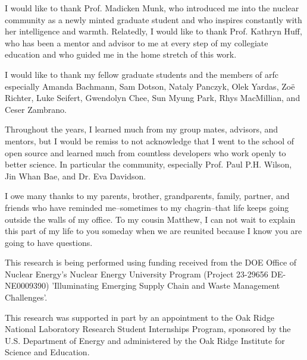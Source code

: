 I would like to thank Prof. Madicken Munk, who introduced me into
the nuclear community as a newly minted graduate student and who inspires
constantly with her intelligence and warmth. Relatedly, I would like to thank
Prof. Kathryn Huff, who has been a mentor and advisor to me at every step of my
collegiate education and who guided me in the home stretch of this work.

I would like to thank my fellow graduate students and the members of
\gls{arfc} especially Amanda Bachmann, Sam Dotson, Nataly Panczyk, Olek Yardas,
Zo\"{e} Richter, Luke Seifert, Gwendolyn Chee, Sun Myung Park, Rhys MacMillian, and Ceser Zambrano.

Throughout the years, I learned much from my group mates, advisors, and
mentors, but I would be remiss to not acknowledge that I went to the school of
open source and learned much from countless developers who work openly to
better science. In particular the \cyclus community, especially Prof. Paul P.H.
Wilson, Jin Whan Bae, and Dr. Eva Davidson.

I owe many thanks to my parents, brother, grandparents, family, partner, and
friends who have reminded me--sometimes to my chagrin--that life keeps going
outside the walls of my office. To my cousin Matthew, I can not wait to explain
this part of my life to you someday when we are reunited because I know you are
going to have questions.

This research is being performed using funding received from the DOE Office of
Nuclear Energy's Nuclear Energy University Program (Project 23-29656
DE-NE0009390) 'Illuminating Emerging Supply Chain and Waste Management
Challenges'.

This research was supported in part by an appointment to the Oak Ridge National
Laboratory Research Student Internships Program, sponsored by the U.S.
Department of Energy and administered by the Oak Ridge Institute for Science
and Education.